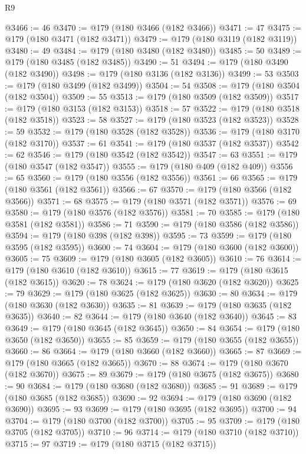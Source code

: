 \begin{lexlean}{R9}
\begin{coremodule}
@3466 := 46
@3470 := @179 (@180 @3466 (@182 @3466))
@3471 := 47
@3475 := @179 (@180 @3471 (@182 @3471))
@3479 := @179 (@180 @3119 (@182 @3119))
@3480 := 49
@3484 := @179 (@180 @3480 (@182 @3480))
@3485 := 50
@3489 := @179 (@180 @3485 (@182 @3485))
@3490 := 51
@3494 := @179 (@180 @3490 (@182 @3490))
@3498 := @179 (@180 @3136 (@182 @3136))
@3499 := 53
@3503 := @179 (@180 @3499 (@182 @3499))
@3504 := 54
@3508 := @179 (@180 @3504 (@182 @3504))
@3509 := 55
@3513 := @179 (@180 @3509 (@182 @3509))
@3517 := @179 (@180 @3153 (@182 @3153))
@3518 := 57
@3522 := @179 (@180 @3518 (@182 @3518))
@3523 := 58
@3527 := @179 (@180 @3523 (@182 @3523))
@3528 := 59
@3532 := @179 (@180 @3528 (@182 @3528))
@3536 := @179 (@180 @3170 (@182 @3170))
@3537 := 61
@3541 := @179 (@180 @3537 (@182 @3537))
@3542 := 62
@3546 := @179 (@180 @3542 (@182 @3542))
@3547 := 63
@3551 := @179 (@180 @3547 (@182 @3547))
@3555 := @179 (@180 @409 (@182 @409))
@3556 := 65
@3560 := @179 (@180 @3556 (@182 @3556))
@3561 := 66
@3565 := @179 (@180 @3561 (@182 @3561))
@3566 := 67
@3570 := @179 (@180 @3566 (@182 @3566))
@3571 := 68
@3575 := @179 (@180 @3571 (@182 @3571))
@3576 := 69
@3580 := @179 (@180 @3576 (@182 @3576))
@3581 := 70
@3585 := @179 (@180 @3581 (@182 @3581))
@3586 := 71
@3590 := @179 (@180 @3586 (@182 @3586))
@3594 := @179 (@180 @398 (@182 @398))
@3595 := 73
@3599 := @179 (@180 @3595 (@182 @3595))
@3600 := 74
@3604 := @179 (@180 @3600 (@182 @3600))
@3605 := 75
@3609 := @179 (@180 @3605 (@182 @3605))
@3610 := 76
@3614 := @179 (@180 @3610 (@182 @3610))
@3615 := 77
@3619 := @179 (@180 @3615 (@182 @3615))
@3620 := 78
@3624 := @179 (@180 @3620 (@182 @3620))
@3625 := 79
@3629 := @179 (@180 @3625 (@182 @3625))
@3630 := 80
@3634 := @179 (@180 @3630 (@182 @3630))
@3635 := 81
@3639 := @179 (@180 @3635 (@182 @3635))
@3640 := 82
@3644 := @179 (@180 @3640 (@182 @3640))
@3645 := 83
@3649 := @179 (@180 @3645 (@182 @3645))
@3650 := 84
@3654 := @179 (@180 @3650 (@182 @3650))
@3655 := 85
@3659 := @179 (@180 @3655 (@182 @3655))
@3660 := 86
@3664 := @179 (@180 @3660 (@182 @3660))
@3665 := 87
@3669 := @179 (@180 @3665 (@182 @3665))
@3670 := 88
@3674 := @179 (@180 @3670 (@182 @3670))
@3675 := 89
@3679 := @179 (@180 @3675 (@182 @3675))
@3680 := 90
@3684 := @179 (@180 @3680 (@182 @3680))
@3685 := 91
@3689 := @179 (@180 @3685 (@182 @3685))
@3690 := 92
@3694 := @179 (@180 @3690 (@182 @3690))
@3695 := 93
@3699 := @179 (@180 @3695 (@182 @3695))
@3700 := 94
@3704 := @179 (@180 @3700 (@182 @3700))
@3705 := 95
@3709 := @179 (@180 @3705 (@182 @3705))
@3710 := 96
@3714 := @179 (@180 @3710 (@182 @3710))
@3715 := 97
@3719 := @179 (@180 @3715 (@182 @3715))

\end{coremodule}
\end{lexlean}
